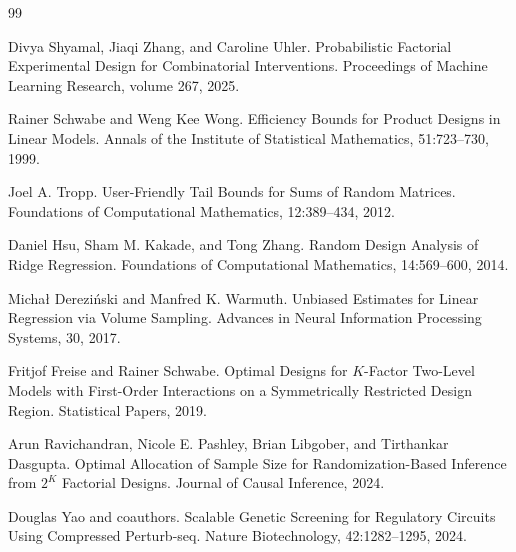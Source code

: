 \documentclass{article}
\begin{document}
\begin{thebibliography}{99}

   Divya Shyamal, Jiaqi Zhang, and Caroline Uhler. Probabilistic Factorial Experimental Design for Combinatorial Interventions. Proceedings of Machine Learning Research, volume 267, 2025.

   Rainer Schwabe and Weng Kee Wong. Efficiency Bounds for Product Designs in Linear Models. Annals of the Institute of Statistical Mathematics, 51:723--730, 1999.

   Joel A. Tropp. User-Friendly Tail Bounds for Sums of Random Matrices. Foundations of Computational Mathematics, 12:389--434, 2012.

   Daniel Hsu, Sham M. Kakade, and Tong Zhang. Random Design Analysis of Ridge Regression. Foundations of Computational Mathematics, 14:569--600, 2014.

   Michał Dereziński and Manfred K. Warmuth. Unbiased Estimates for Linear Regression via Volume Sampling. Advances in Neural Information Processing Systems, 30, 2017.

   Fritjof Freise and Rainer Schwabe. Optimal Designs for \(K\)-Factor Two-Level Models with First-Order Interactions on a Symmetrically Restricted Design Region. Statistical Papers, 2019.

   Arun Ravichandran, Nicole E. Pashley, Brian Libgober, and Tirthankar Dasgupta. Optimal Allocation of Sample Size for Randomization-Based Inference from \(2^K\) Factorial Designs. Journal of Causal Inference, 2024.

   Douglas Yao and coauthors. Scalable Genetic Screening for Regulatory Circuits Using Compressed Perturb-seq. Nature Biotechnology, 42:1282--1295, 2024.

\end{thebibliography}
\end{document}
